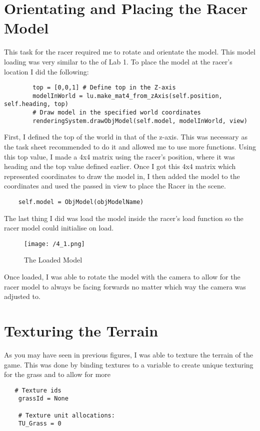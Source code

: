 \documentclass[11pt, oneside, a4paper]{article}
\begin{document}
\section{Orientating and Placing the Racer Model}
This task for the racer required me to rotate and orientate the model. This model loading was very similar to the of Lab 1. To place the model at the racer's location I did the following:

\begin{lstlisting}  
        top = [0,0,1] # Define top in the Z-axis
        modelInWorld = lu.make_mat4_from_zAxis(self.position, self.heading, top)
        # Draw model in the specified world coordinates
        renderingSystem.drawObjModel(self.model, modelInWorld, view) 
\end{lstlisting}

First, I defined the top of the world in that of the z-axis. This was necessary as the task sheet recommended to do it and allowed me to use more functions. Using this top value, I made a 4x4 matrix using the racer's position, where it was heading and the top value defined earlier. Once I got this 4x4 matrix which represented coordinates to draw the model in, I then added the model to the coordinates and used the passed in view to place the Racer in the scene. 

\begin{lstlisting}  
	self.model = ObjModel(objModelName)
\end{lstlisting}

The last thing I did was load the model inside the racer's load function so the racer model could initialise on load. 

\begin{figure}[!ht]
	\centerline{\texttt{[image: /4\_1.png]}}
	\caption{The Loaded Model}
	\label{fig:figure4}
\end{figure}
Once loaded, I was able to rotate the model with the camera to allow for the racer model to always be facing forwards no matter which way the camera was adjusted to.

\section{Texturing the Terrain}
As you may have seen in previous figures, I was able to texture the terrain of the game. This was done by binding textures to a variable to create unique texturing for the grass and to allow for more 

\begin{lstlisting}  
   # Texture ids
    grassId = None

    # Texture unit allocations:
    TU_Grass = 0
\end{lstlisting}
\end{document}
